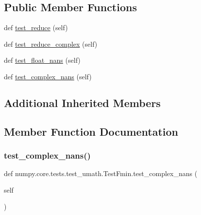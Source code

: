 \subsection*{Public Member Functions}
\begin{DoxyCompactItemize}
\item 
def \hyperlink{classnumpy_1_1core_1_1tests_1_1test__umath_1_1TestFmin_a1451e582b474ab7a01b2972bc902df19}{test\+\_\+reduce} (self)
\item 
def \hyperlink{classnumpy_1_1core_1_1tests_1_1test__umath_1_1TestFmin_a157767cda951eb1bddaea0e4fed464cd}{test\+\_\+reduce\+\_\+complex} (self)
\item 
def \hyperlink{classnumpy_1_1core_1_1tests_1_1test__umath_1_1TestFmin_a8cc4efb2a031da4cd68926641b8d25ad}{test\+\_\+float\+\_\+nans} (self)
\item 
def \hyperlink{classnumpy_1_1core_1_1tests_1_1test__umath_1_1TestFmin_a821cdf980f579f2efc40960ca7f72550}{test\+\_\+complex\+\_\+nans} (self)
\end{DoxyCompactItemize}
\subsection*{Additional Inherited Members}


\subsection{Member Function Documentation}
\mbox{\label{classnumpy_1_1core_1_1tests_1_1test__umath_1_1TestFmin_a821cdf980f579f2efc40960ca7f72550}} 
\subsubsection{\texorpdfstring{test\+\_\+complex\+\_\+nans()}{test\_complex\_nans()}}
{\footnotesize\ttfamily def numpy.\+core.\+tests.\+test\+\_\+umath.\+Test\+Fmin.\+test\+\_\+complex\+\_\+nans (\begin{DoxyParamCaption}\item[{}]{self }\end{DoxyParamCaption})}

